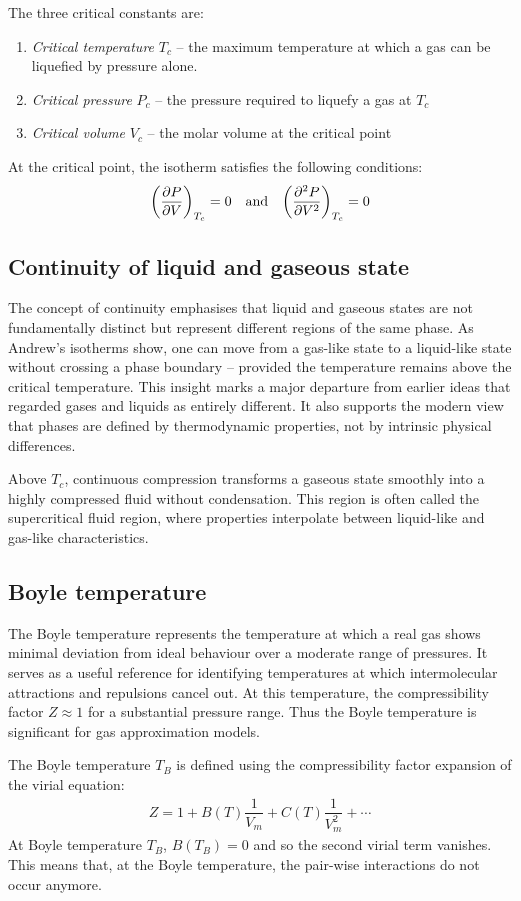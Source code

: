 		The three critical constants are:
		\begin{enumerate}
			\item \emph{Critical temperature} $T_c$ -- the maximum temperature at which a gas can be liquefied by pressure alone.
			
			\item \emph{Critical pressure} $P_c$ -- the pressure required to liquefy a gas at $T_c$
			
			\item \emph{Critical volume} $V_c$ -- the molar volume at the critical point
		\end{enumerate}
		
		At the critical point, the isotherm satisfies the following conditions:
		\begin{align*}
			\qty(\pdv{P}{V})_{T_c}=0\qq{and}\qty(\pdv[2]{P}{V})_{T_c}=0
		\end{align*}
		
	\subsection{Continuity of liquid and gaseous state}
		The concept of continuity emphasises that liquid and gaseous states are not fundamentally distinct but represent different regions of the same phase. As Andrew’s isotherms show, one can move from a gas-like state to a liquid-like state without crossing a phase boundary -- provided the temperature remains above the critical temperature. This insight marks a major departure from earlier ideas that regarded gases and liquids as entirely different. It also supports the modern view that phases are defined by thermodynamic properties, not by intrinsic physical differences.
		
		Above $T_c$, continuous compression transforms a gaseous state smoothly into a highly compressed fluid without condensation. This region is often called the supercritical fluid region, where properties interpolate between liquid-like and gas-like characteristics.
		
	\subsection{Boyle temperature}
		The Boyle temperature represents the temperature at which a real gas shows minimal deviation from ideal behaviour over a moderate range of pressures. It serves as a useful reference for identifying temperatures at which intermolecular attractions and repulsions cancel out. At this temperature, the compressibility factor $Z\approx 1$ for a substantial pressure range. Thus the Boyle temperature is significant for gas approximation models.
		
		The Boyle temperature $T_B$ is defined using the compressibility factor expansion of the virial equation:
		\begin{align*}
			Z=1+B(T)\dfrac{1}{V_m}+C(T)\dfrac{1}{V_m^2}+\cdots
		\end{align*}
		At Boyle temperature $T_B$, $B(T_B)=0$ and so the second virial term vanishes. This means that, at the Boyle temperature, the pair-wise interactions do not occur anymore.